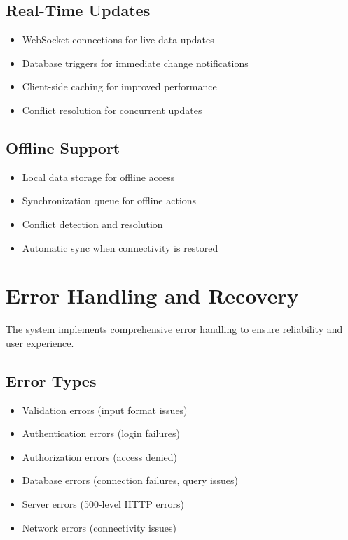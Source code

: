 \subsection{Real-Time Updates}

\begin{itemize}
    \item WebSocket connections for live data updates
    \item Database triggers for immediate change notifications
    \item Client-side caching for improved performance
    \item Conflict resolution for concurrent updates
\end{itemize}

\subsection{Offline Support}

\begin{itemize}
    \item Local data storage for offline access
    \item Synchronization queue for offline actions
    \item Conflict detection and resolution
    \item Automatic sync when connectivity is restored
\end{itemize}

\section{Error Handling and Recovery}

The system implements comprehensive error handling to ensure reliability and user experience.

\subsection{Error Types}

\begin{itemize}
    \item Validation errors (input format issues)
    \item Authentication errors (login failures)
    \item Authorization errors (access denied)
    \item Database errors (connection failures, query issues)
    \item Server errors (500-level HTTP errors)
    \item Network errors (connectivity issues)
\end{itemize}

